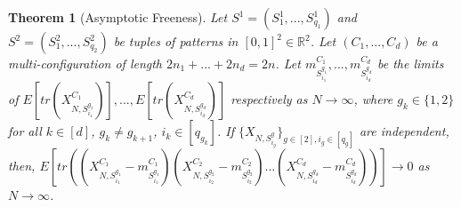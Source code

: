 \documentclass[12pt]{amsart}
\newtheorem{thm}{Theorem}[section]
\theoremstyle{definition}
\theoremstyle{remark}
\begin{document}


\begin{thm}[Asymptotic Freeness] \label{freethm}
Let $S^1=(S_1^1,...,S_{q_1}^1)$ and $S^2=(S_1^2,...,S_{q_2}^2)$ be tuples of patterns in $[0,1]^2 \in \mathbb{R}^2$. Let $(C_1,...,C_{d})$ be a multi-configuration of length $2n_1+...+2n_d=2n$. Let $m_{S_{i_1}^{g_1}}^{C_{1}},...,m_{S_{i_d}^{g_d}}^{C_d}$ be the limits of $E[tr(X_{N,S_{i_1}^{g_1}}^{C_{1}})],...,E[tr(X_{N,S_{i_d}^{g_d}}^{C_d})]$ respectively as $N \to \infty$, where $g_k \in \{1,2\}$ for all $k \in [d]$, $g_k \neq g_{k+1}$, $i_k \in [q_{g_k}]$. If $\{X_{N,S_{i_g}^{g}}\}_{g \in [2], i_g \in [q_g]}$ are independent, then, $E[tr((X_{N,S_{i_1}^{g_1}}^{C_1}- m_{S_{i_1}^{g_1}}^{C_1}) (X_{N,S_{i_2}^{g_2}}^{C_2}- m_{S_{i_2}^{g_2}}^{C_2})...(X_{N,S_{i_d}^{g_d}}^{C_d}- m_{S_{i_d}^{g_d}}^{C_d}))] \to 0$ as $N \to \infty$.
\end{thm}

\end{document}
